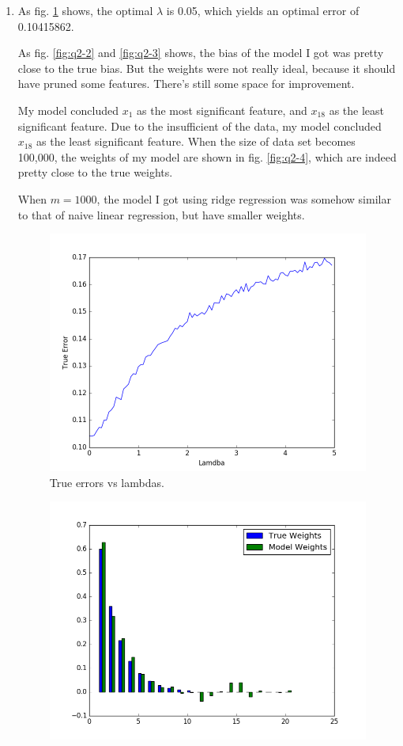\documentclass[letter, 12pt]{article}
\begin{document}
\begin{enumerate}
    	\item {}
    	\par{As fig. \ref{fig:q2-1} shows, the optimal $ \lambda $ is 0.05, which yields an optimal error of 0.10415862.}
    	\par{As fig. \ref{fig:q2-2} and \ref{fig:q2-3} shows, the bias of the model I got was pretty close to the true bias. But the weights were not really ideal, because it should have pruned some features. There's still some space for improvement.}
    	\par{My model concluded $ x_1 $ as the most significant feature, and $ x_{18} $ as the least significant feature. Due to the insufficient of the data, my model concluded $ x_{18} $ as the least significant feature. When the size of data set becomes 100,000, the weights of my model are shown in fig. \ref{fig:q2-4}, which are indeed pretty close to the true weights.}
    	\par{When $ m = 1000 $, the model I got using ridge regression was somehow similar to that of naive linear regression, but have smaller weights.}
    	\begin{figure}[H]
    		\centering
    		\centering
    		\includegraphics[width=0.7\linewidth]{q2-1.png}
    		\caption{True errors vs lambdas.}
    		\label{fig:q2-1}
    	\end{figure}
    	\begin{figure}[H]
    		\centering
    		\begin{minipage}{.48\textwidth}
    			\centering
    			\includegraphics[width=\linewidth]{q2-2.png}

\end{minipage}
\end{figure}
\end{enumerate}
\end{document}
